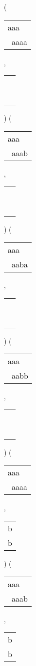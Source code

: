  ( 
\begin{tabular}{|l|} \hline
aaa\ \  \\
\ aaaa \\
\hline
\end{tabular} 
 , 
\begin{tabular}{|l|} \hline
\ \\ \ \\ \hline
\end{tabular} 
) 
 ( 
\begin{tabular}{|l|} \hline
aaa\ \  \\
\ aaab \\
\hline
\end{tabular} 
 , 
\begin{tabular}{|l|} \hline
\ \\ \ \\ \hline
\end{tabular} 
) 
 ( 
\begin{tabular}{|l|} \hline
aaa\ \  \\
\ aaba \\
\hline
\end{tabular} 
 , 
\begin{tabular}{|l|} \hline
\ \\ \ \\ \hline
\end{tabular} 
) 
 ( 
\begin{tabular}{|l|} \hline
aaa\ \  \\
\ aabb \\
\hline
\end{tabular} 
 , 
\begin{tabular}{|l|} \hline
\ \\ \ \\ \hline
\end{tabular} 
) 
 ( 
\begin{tabular}{|l|} \hline
aaa\ \  \\
\ aaaa \\
\hline
\end{tabular} 
 , 
\begin{tabular}{|l|} \hline
b \\
b \\
\hline
\end{tabular} 
) 
 ( 
\begin{tabular}{|l|} \hline
aaa\ \  \\
\ aaab \\
\hline
\end{tabular} 
 , 
\begin{tabular}{|l|} \hline
b \\
b \\
\hline
\end{tabular} 
